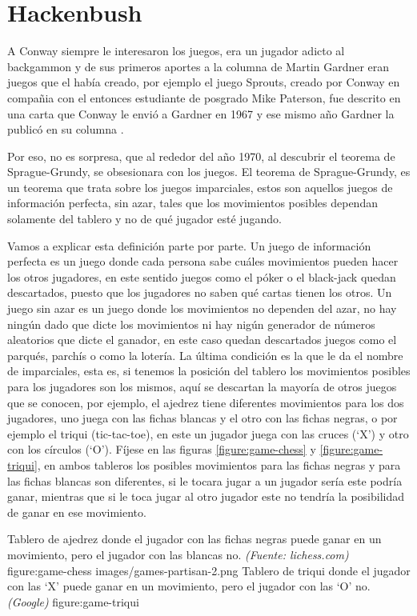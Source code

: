 \section{Hackenbush}

A Conway siempre le interesaron los juegos, era un jugador adicto al backgammon y de sus primeros aportes a la columna de Martin Gardner eran juegos que el hab\'ia creado, por ejemplo el juego Sprouts, creado por Conway en compa\~nia con el entonces estudiante de posgrado Mike Paterson, fue descrito en una carta que Conway le envi\'o a Gardner en 1967 y ese mismo a\~no Gardner la public\'o en su columna \cite{}.

Por eso, no es sorpresa, que al rededor del a\~no 1970, al descubrir el teorema de Sprague-Grundy, se obsesionara con los juegos. El teorema de Sprague-Grundy\cite{}, es un teorema que trata sobre los juegos imparciales, estos son aquellos juegos de informaci\'on perfecta, sin azar, tales que los movimientos posibles dependan solamente del tablero y no de qu\'e jugador est\'e jugando.

Vamos a explicar esta definici\'on parte por parte. Un juego de informaci\'on perfecta es un juego donde cada persona sabe cu\'ales movimientos pueden hacer los otros jugadores, en este sentido juegos como el p\'oker o el black-jack quedan descartados, puesto que los jugadores no saben qu\'e cartas tienen los otros. Un juego sin azar es un juego donde los movimientos no dependen del azar, no hay ning\'un dado que dicte los movimientos ni hay nig\'un generador de n\'umeros aleatorios que dicte el ganador, en este caso quedan descartados juegos como el parqu\'es, parch\'is o como la loter\'ia. La \'ultima condici\'on es la que le da el nombre de imparciales, esta es, si tenemos la posici\'on del tablero los movimientos posibles para los jugadores son los mismos, aqu\'i se descartan la mayor\'ia de otros juegos que se conocen, por ejemplo, el ajedrez tiene diferentes movimientos para los dos jugadores, uno juega con las fichas blancas y el otro con las fichas negras, o por ejemplo el triqui (tic-tac-toe), en este un jugador juega con las cruces (`X') y otro con los c\'irculos (`O'). F\'ijese en las figuras \ref{figure:game-chess} y \ref{figure:game-triqui}, en ambos tableros los posibles movimientos para las fichas negras y para las fichas blancas son diferentes, si le tocara jugar a un jugador ser\'ia este podr\'ia ganar, mientras que si le toca jugar al otro jugador este no tendr\'ia la posibilidad de ganar en ese movimiento.

         {Tablero de ajedrez donde el jugador con las fichas negras puede ganar en un movimiento, pero el jugador con las blancas no. \textit{(Fuente: lichess.com)}} %
         {figure:game-chess} %
         {images/games-partisan-2.png} %
         {Tablero de triqui donde el jugador con las `X' puede ganar en un movimiento, pero el jugador con las `O' no. \textit{(Google)}} %
         {figure:game-triqui} %

